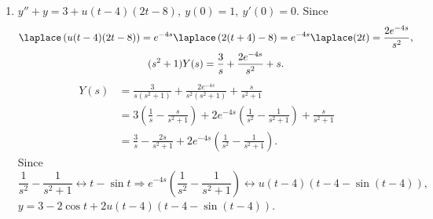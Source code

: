 \documentclass[openany]{book}
\newenvironment{sectionSolutions}{
 \begin{enumerate}[item-label={\thesection.\arabic{enumi}.}]
}{
 \end{enumerate}
}
\begin{document}
\begin{sectionSolutions}
\item
 $y''+y=3+u(t-4)(2t-8),\ y(0)=1,\ y'(0)=0$.
Since
\begin{gather*}
\laplace \left(u(t-4)(2t-8)\right)=e^{-4s}\laplace \left(2(t+4)-8\right)
=e^{-4s}\laplace (2t)=\frac{2e^{-4s}}{ s^2},
\\
(s^2+1)Y(s)=\frac{3}{ s}+\frac{2e^{-4s}}{ s^2}+s.
\end{gather*}
\begin{align*}
Y(s)&=\frac{3}{ s(s^2+1)}+\frac{2e^{-4s}}{ s^2(s^2+1)}+\frac{s}{ s^2+1}\\
&=3\left(\frac{1}{ s}-\frac{s}{ s^2+1}\right)+2e^{-4s}
\left(\frac{1}{ s^2}-\frac{1}{ s^2+1}\right)+\frac{s}{ s^2+1}\\
&=\frac{3}{ s}-\frac{2s}{ s^2+1}+2e^{-4s}\left(\frac{1}{ s^2}-\frac{1}{
s^2+1}\right).
\end{align*}
Since
\[
\frac{1}{ s^2}-\frac{1}{ s^2+1}\leftrightarrow t-\sin t\Rightarrow
e^{-4s}\left(\frac{1}{ s^2}-\frac{1}{ s^2+1}\right)\leftrightarrow
u(t-4)\left(t-4-\sin(t-4)\right),
\]
$y=3-2\cos t+2u(t-4)\left(t-4-\sin(t-4)\right)$.



\end{sectionSolutions}
\end{document}
